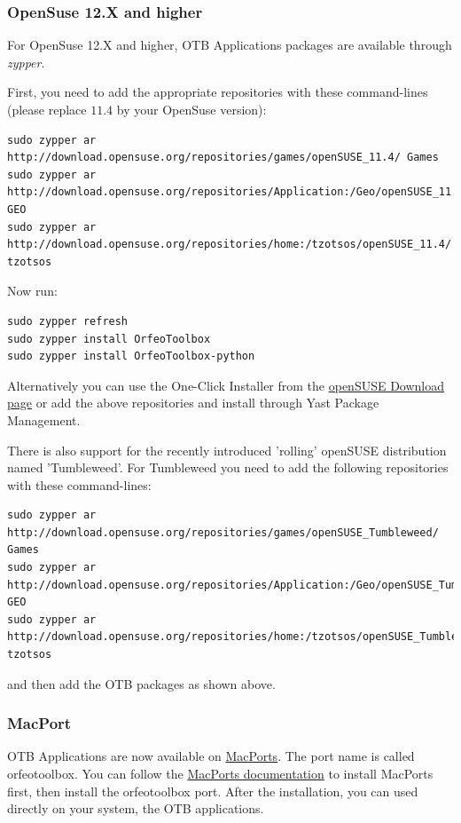 \subsubsection{OpenSuse 12.X and higher}

For OpenSuse 12.X and higher, OTB Applications packages are available through
\emph{zypper}.

First, you need to add the appropriate repositories with these command-lines (please replace $11.4$ by your OpenSuse version):
\begin{verbatim}
sudo zypper ar
http://download.opensuse.org/repositories/games/openSUSE_11.4/ Games
sudo zypper ar
http://download.opensuse.org/repositories/Application:/Geo/openSUSE_11.4/ GEO
sudo zypper ar
http://download.opensuse.org/repositories/home:/tzotsos/openSUSE_11.4/ tzotsos
\end{verbatim}

Now run:
\begin{verbatim}
sudo zypper refresh
sudo zypper install OrfeoToolbox
sudo zypper install OrfeoToolbox-python
\end{verbatim}

Alternatively you can use the One-Click Installer from the \href{http://software.opensuse.org/search?q=Orfeo&baseproject=openSUSE\%3A11.4&lang=en&include_home=true&exclude_debug=true}{openSUSE Download page} or add the above repositories and install through Yast Package Management.

There is also support for the recently introduced 'rolling' openSUSE distribution named 'Tumbleweed'.
For Tumbleweed you need to add the following repositories with these command-lines:
\begin{verbatim}
sudo zypper ar
http://download.opensuse.org/repositories/games/openSUSE_Tumbleweed/ Games
sudo zypper ar
http://download.opensuse.org/repositories/Application:/Geo/openSUSE_Tumbleweed/ GEO
sudo zypper ar
http://download.opensuse.org/repositories/home:/tzotsos/openSUSE_Tumbleweed/ tzotsos
\end{verbatim}
and then add the OTB packages as shown above.

\subsubsection{MacPort}

OTB Applications are now available on \href{http://http://www.macports.org/}{MacPorts}.
The port name is called orfeotoolbox.
You can follow the \href{ http://guide.macports.org/}{MacPorts documentation} to install MacPorts first, then install the orfeotoolbox port.
After the installation, you can used directly on your system, the OTB applications.

